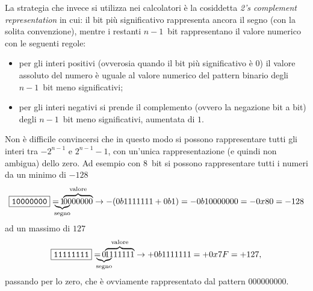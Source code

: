 La strategia che invece si utilizza nei calcolatori \`e la cosiddetta
\emph{2's complement representation} in cui: il bit pi\`u significativo rappresenta
ancora il segno (con la solita convenzione), mentre i restanti $n - 1$~bit rappresentano
il valore numerico con le seguenti regole:
\begin{itemize}
  \item per gli interi positivi (ovverosia quando il bit pi\`u significativo \`e $0$)
    il valore assoluto del numero \`e uguale al valore numerico del pattern binario
    degli $n - 1$~bit meno significativi;
  \item per gli interi negativi si prende il complemento (ovvero la negazione bit a bit)
    degli $n - 1$~bit meno significativi, aumentata di $1$.
\end{itemize}
Non \`e difficile convincersi che in questo modo si possono rappresentare tutti gli
interi tra $-2^{n - 1}$ e $2^{n - 1} - 1$, con un'unica rappresentazione (e quindi non
ambigua) dello zero. Ad esempio con $8$~bit si possono rappresentare tutti i numeri
da un minimo di $-128$
\begin{align*}
  \byte{10000000} = \!\!\!\!\!
  \underbrace{1}_\text{segno}\!\!\!\!\!\!\overbrace{0000000}^\text{valore}
  \rightarrow -(0b1111111 + 0b1) = -0b10000000 = -0x80 = -128
\end{align*}
ad un massimo di $127$
\begin{align*}
  \byte{11111111} = \!\!\!\!\!
  \underbrace{0}_\text{segno}\!\!\!\!\!\!\overbrace{1111111}^\text{valore}
  \rightarrow +0b1111111 = +0x7F = +127,
\end{align*}
passando per lo zero, che \`e ovviamente rappresentato dal pattern $000000000$.

\begin{table}[!htb]
\end{table}


